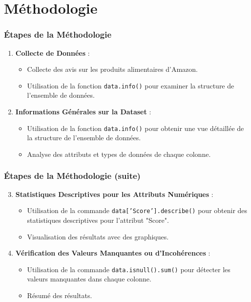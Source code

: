 \section{Méthodologie}

\begin{frame}
    \frametitle{Étapes de la Méthodologie}
    \begin{enumerate}
        \item \textbf{Collecte de Données} :
            \begin{itemize}
                \item Collecte des avis sur les produits alimentaires d'Amazon.
                \item Utilisation de la fonction \texttt{data.info()} pour examiner la structure de l'ensemble de données.
            \end{itemize}
        \item \textbf{Informations Générales sur la Dataset} :
            \begin{itemize}
                \item Utilisation de la fonction \texttt{data.info()} pour obtenir une vue détaillée de la structure de l'ensemble de données.
                \item Analyse des attributs et types de données de chaque colonne.
            \end{itemize}
    \end{enumerate}
\end{frame}

\begin{frame}
    \frametitle{Étapes de la Méthodologie (suite)}

    \begin{enumerate}
        \setcounter{enumi}{2}
        \item \textbf{Statistiques Descriptives pour les Attributs Numériques} :
            \begin{itemize}
                \item Utilisation de la commande \texttt{data['Score'].describe()} pour obtenir des statistiques descriptives pour l'attribut "Score".
                \item Visualisation des résultats avec des graphiques.
            \end{itemize}
        \item \textbf{Vérification des Valeurs Manquantes ou d'Incohérences} :
            \begin{itemize}
                \item Utilisation de la commande \texttt{data.isnull().sum()} pour détecter les valeurs manquantes dans chaque colonne.
                \item Résumé des résultats.
            \end{itemize}
    \end{enumerate}
\end{frame}

